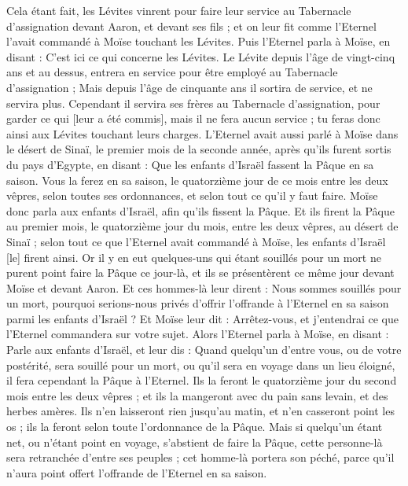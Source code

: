 \begin{multicols}{2}
Cela étant fait, les Lévites vinrent pour faire leur service au Tabernacle d'assignation devant Aaron, et devant ses fils ; et on leur fit comme l'Eternel l'avait commandé à Moïse touchant les Lévites.
Puis l'Eternel parla à Moïse, en disant :
C'est ici ce qui concerne les Lévites. Le Lévite depuis l'âge de vingt-cinq ans et au dessus, entrera en service pour être employé au Tabernacle d'assignation ;
Mais depuis l'âge de cinquante ans il sortira de service, et ne servira plus.
Cependant il servira ses frères au Tabernacle d'assignation, pour garder ce qui [leur a été commis], mais il ne fera aucun service ; tu feras donc ainsi aux Lévites touchant leurs charges.
\VerseOne{}L'Eternel avait aussi parlé à Moïse dans le désert de Sinaï, le premier mois de la seconde année, après qu'ils furent sortis du pays d'Egypte, en disant :
Que les enfants d'Israël fassent la Pâque en sa saison.
Vous la ferez en sa saison, le quatorzième jour de ce mois entre les deux vêpres, selon toutes ses ordonnances, et selon tout ce qu'il y faut faire.
Moïse donc parla aux enfants d'Israël, afin qu'ils fissent la Pâque.
Et ils firent la Pâque au premier mois, le quatorzième jour du mois, entre les deux vêpres, au désert de Sinaï ; selon tout ce que l'Eternel avait commandé à Moïse, les enfants d'Israël [le] firent ainsi.
Or il y en eut quelques-uns qui étant souillés pour un mort ne purent point faire la Pâque ce jour-là, et ils se présentèrent ce même jour devant Moïse et devant Aaron.
Et ces hommes-là leur dirent : Nous sommes souillés pour un mort, pourquoi serions-nous privés d'offrir l'offrande à l'Eternel en sa saison parmi les enfants d'Israël ?
Et Moïse leur dit : Arrêtez-vous, et j'entendrai ce que l'Eternel commandera sur votre sujet.
Alors l'Eternel parla à Moïse, en disant :
Parle aux enfants d'Israël, et leur dis : Quand quelqu'un d'entre vous, ou de votre postérité, sera souillé pour un mort, ou qu'il sera en voyage dans un lieu éloigné, il fera cependant la Pâque à l'Eternel.
Ils la feront le quatorzième jour du second mois entre les deux vêpres ; et ils la mangeront avec du pain sans levain, et des herbes amères.
Ils n'en laisseront rien jusqu'au matin, et n'en casseront point les os ; ils la feront selon toute l'ordonnance de la Pâque.
Mais si quelqu'un étant net, ou n'étant point en voyage, s'abstient de faire la Pâque, cette personne-là sera retranchée d'entre ses peuples ; cet homme-là portera son péché, parce qu'il n'aura point offert l'offrande de l'Eternel en sa saison.

\end{multicols}
